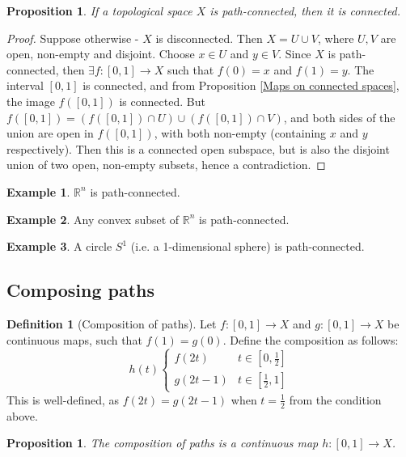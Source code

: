 \documentclass{article}
\theoremstyle{definition}
\newtheorem{defn}{Definition}[section]
\newtheorem{exmp}{Example}[section]
\theoremstyle{plain}%
\newtheorem{prop}[thm]{Proposition}
\theoremstyle{remark}
\newcommand{\union}{\cup}
\newcommand{\intersection}{\cap}
\newcommand{\R}{\mathbb{R}}
\begin{document}
\begin{prop}
    If a topological space $X$ is path-connected, then it is connected.
\end{prop}

\begin{proof}
    Suppose otherwise - $X$ is disconnected. Then $X = U \union V$, where $U,V$ are open, non-empty and disjoint. Choose $x \in U$ and $y \in V$. Since $X$ is path-connected, then $\exists f: [0,1] \to X$ such that $f(0) = x$ and $f(1) = y$. The interval $[0,1]$ is connected, and from Proposition \ref{Maps on connected spaces}, the image $f([0,1])$ is connected. But $f([0,1]) = \left( f([0,1]) \intersection U \right) \union \left( f([0,1]) \intersection V \right)$, and both sides of the union are open in $f([0,1])$, with both non-empty (containing $x$ and $y$ respectively). Then this is a connected open subspace, but is also the disjoint union of two open, non-empty subsets, hence a contradiction.
\end{proof}

\begin{exmp}
    $\R^n$ is path-connected.
\end{exmp}

\begin{exmp}
    Any convex subset of $\R^n$ is path-connected.
\end{exmp}

\begin{exmp}
    A circle $S^1$ (i.e. a 1-dimensional sphere) is path-connected.
\end{exmp}

\subsection{Composing paths}

\begin{defn}[Composition of paths]
    Let $f: [0,1] \to X$ and $g: [0,1] \to X$ be continuous maps, such that $f(1) = g(0)$. Define the composition as follows: \[h(t) \begin{cases} f(2t) &t \in [0, \frac{1}{2}] \\ g(2t - 1) &t \in [\frac{1}{2}, 1] \end{cases}\]
    This is well-defined, as $f(2t) = g(2t-1)$ when $t = \frac{1}{2}$ from the condition above.
\end{defn}

\begin{prop}
    The composition of paths is a continuous map $h : [0,1] \to X$.
\end{prop}
\end{document}
